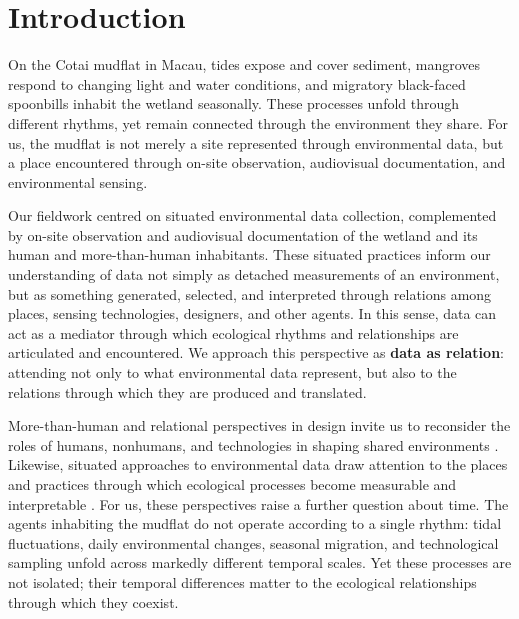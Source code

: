 \documentclass[manuscript,review,anonymous]{acmart}
\begin{document}


\maketitle
\section{Introduction}

On the Cotai mudflat in Macau, tides expose and cover sediment, mangroves respond to changing light and water conditions, and migratory black-faced spoonbills inhabit the wetland seasonally. These processes unfold through different rhythms, yet remain connected through the environment they share. For us, the mudflat is not merely a site represented through environmental data, but a place encountered through on-site observation, audiovisual documentation, and environmental sensing.

Our fieldwork centred on situated environmental data collection, complemented by on-site observation and audiovisual documentation of the wetland and its human and more-than-human inhabitants. These situated practices inform our understanding of data not simply as detached measurements of an environment, but as something generated, selected, and interpreted through relations among places, sensing technologies, designers, and other agents. In this sense, data can act as a mediator through which ecological rhythms and relationships are articulated and encountered. We approach this perspective as \textbf{data as relation}: attending not only to what environmental data represent, but also to the relations through which they are produced and translated.

More-than-human and relational perspectives in design invite us to reconsider the roles of humans, nonhumans, and technologies in shaping shared environments \cite{giaccardi2020,wakkary2021}. Likewise, situated approaches to environmental data draw attention to the places and practices through which ecological processes become measurable and interpretable \cite{loukissas2019,gabrys2016}. For us, these perspectives raise a further question about time. The agents inhabiting the mudflat do not operate according to a single rhythm: tidal fluctuations, daily environmental changes, seasonal migration, and technological sampling unfold across markedly different temporal scales. Yet these processes are not isolated; their temporal differences matter to the ecological relationships through which they coexist.
\end{document}
